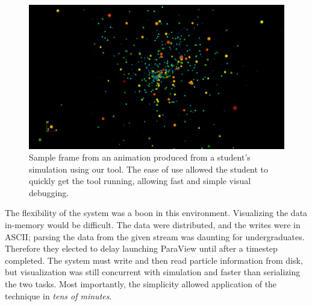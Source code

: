 \begin{figure}
  \centering
  \includegraphics[width=\linewidth]{images/fp/pv-nbody-better}
  \caption{Sample frame from an animation produced from a student's
  simulation using our tool.  The ease of use allowed the student
  to quickly get the tool running, allowing fast and simple visual
  debugging.}
  \label{fig:nbody}
\end{figure}

The flexibility of the system was a boon in this environment.
Visualizing the data in-memory would be difficult. The data were
distributed, and the writes were in ASCII; parsing the data from the
given stream was daunting for undergraduates.  Therefore they elected
to delay launching ParaView until after a timestep completed.  The
system must write and then read particle information from disk, but
visualization was still concurrent with simulation and faster than
serializing the two tasks.  Most importantly, the simplicity allowed
application of the technique in
\textit{tens of minutes}.

%
%
%
%
%

